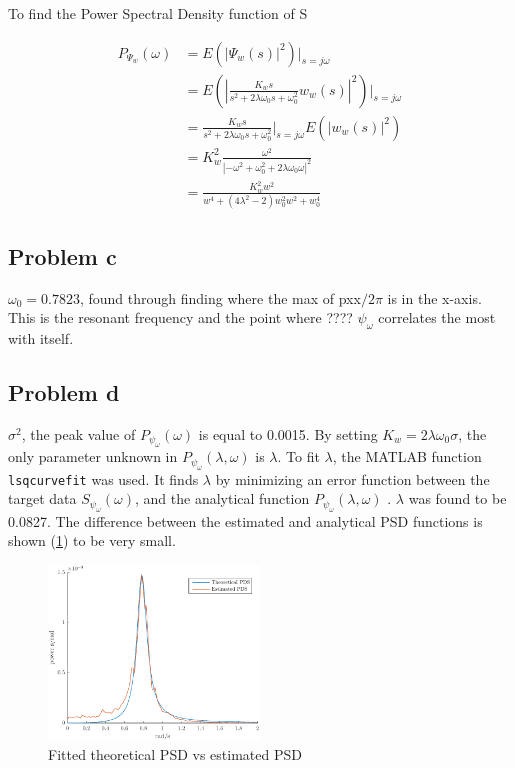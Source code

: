 To find the Power Spectral Density function of S

\begin{align*}
    P_{\Psi_w}(\omega) &= E(\left|\Psi_w(s)\right|^2)|_{s=j\omega} \\
    &= E\left(\left|\frac{K_ws}{s^2 + 2\lambda\omega_0s + \omega^2_0}w_w(s)\right|^2\right)|_{s=j\omega} \\
    &= \frac{K_ws}{s^2 + 2\lambda\omega_0s + \omega^2_0}|_{s=j\omega} E(\left|w_w(s)\right|^2) \\
    &= K_w^2\frac{\omega^2}{\left|-\omega^2+\omega^2_0+2\lambda\omega_0\omega\right|^2} \\
    &= \frac{K_w^2w^2}{w^4+(4\lambda^2-2)w_0^2w^2+w_0^4}
\end{align*}

\subsection{Problem c}

$\omega_0 = 0.7823$, found through finding where the max of pxx$/2\pi$ is in the x-axis. This is the resonant 
frequency and the point where ???? $\psi_\omega$ correlates the most with itself. 

\subsection{Problem d}
$\sigma^2$, the peak value of $P_{\psi_\omega}(\omega)$ is equal to 0.0015.
By setting $K_w = 2\lambda\omega_0\sigma$, the only parameter unknown in $P_{\psi_\omega}(\lambda, \omega)$ is $\lambda$. To fit $\lambda$, the MATLAB function \texttt{lsqcurvefit} was used. It finds $\lambda$ by minimizing an error
function between the target data $S_{\psi_\omega}(\omega)$, and the analytical function $P_{\psi_\omega}(\lambda, \omega)$ . $\lambda$ was found to be 0.0827. The difference between the estimated and analytical PSD functions is shown (\cref{fig:2d-fitted_theoretical_PSD_vs_estimated_PSD}) to be very small.

\begin{figure}[ht]
    \centering
    \includegraphics[width=0.5\textwidth]{images/2d-fitted_theoretical_PSD_vs_estimated_PSD}
    \caption{Fitted theoretical PSD vs estimated PSD}
    \label{fig:2d-fitted_theoretical_PSD_vs_estimated_PSD}
\end{figure}
